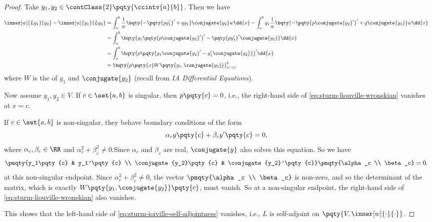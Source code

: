 \begin{proof}
    Take \(y_1, y_2 \in \contClass{2} \pqty{\ccintv{a}{b}}\). Then we have
    \begin{subequations}
        \label{eq:sturm-ioiville-self-adjointness}%
        \begin{align}
            \inner[w]{L y_1}{y_2} - \inner[w]{y_1}{L y_2} &= \int_{a}^{b} \frac{1}{w} \bqty{- \pqty{p y_1'}' + q y_1} \conjugate{y_2} w \dd{x} - \int_{a}^{b} y_1 \frac{1}{w} \bqty{- \pqty{p \conjugate{y_2}'}' + q \conjugate{y_2}} w \dd{x} \\
            &= \int_{a}^{b} \bqty{y_1 \pqty{p \conjugate{y_2}'}' - \pqty{p y_1'}' \conjugate{y_2}} \dd{x} \\
            &= \int_{a}^{b} \bqty{p \pqty{y_1 \conjugate{y_2}' - y_1' \conjugate{y_2}}}' \dd{x} \\
            &= \bqty{p \pqty{x} W\pqty{y_1, \conjugate{y_2}}}_{x = a}^{b}, \label{eq:sturm-liouville-wronskian}%
        \end{align}
    \end{subequations}
    where \(W\) is the  of \(y_1\) and \(\conjugate{y_2}\) (recall from \textit{IA Differential Equations}).

    Now assume \(y_1, y_2 \in V\). If \(c \in \set{a, b}\) is singular, then \(p \pqty{c} = 0\), i.e., the right-hand side of \eqref{eq:sturm-liouville-wronskian} vanishes at \(x = c\).

    If \(c \in \set{a, b}\) is non-singular, they behave boundary conditions of the form
    \begin{equation}
        \alpha_c y\pqty{c} + \beta_c y'\pqty{c} = 0,
    \end{equation}
    where \(\alpha_c, \beta_c \in \RR\) and \(\alpha_c^2 + \beta_c^2 \neq 0\).Since \(\alpha_c\) and \(\beta_c\) are real, \(\conjugate{y}\) also solves this equation. So we have
    \begin{equation}
        \pmqty{y_1\pqty{c} & y_1'\pqty{c} \\ \conjugate{y_2}\pqty{c} & \conjugate{y_2}'\pqty{c}} \pmqty{\alpha_c \\ \beta_c} = 0.
    \end{equation}
    at this non-singular endpoint. Since \(\alpha_c^2 + \beta_c^2 \neq 0\), the vector \(\pmqty{\alpha_c \\ \beta_c}\) is non-zero, and so the determinant of the matrix, which is exactly \(W\pqty{y_1, \conjugate{y_2}}\pqty{c}\), must vanish. So at a non-singular endpoint, the right-hand side of \eqref{eq:sturm-liouville-wronskian} also vanishes.

    This shows that the left-hand side of \eqref{eq:sturm-ioiville-self-adjointness} vanishes, i.e., \(L\) is self-adjoint on \(\pqty{V, \inner[w]{\cdot}{\cdot}}\).
\end{proof}

